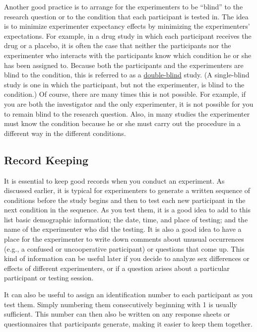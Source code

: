 \documentclass[
]{krantz}
\begin{document}
Another good practice is to arrange for the experimenters to be ``blind'' to the research question or to the condition that each participant is tested in. The idea is to minimize experimenter expectancy effects by minimizing the experimenters' expectations. For example, in a drug study in which each participant receives the drug or a placebo, it is often the case that neither the participants nor the experimenter who interacts with the participants know which condition he or she has been assigned to. Because both the participants and the experimenters are blind to the condition, this is referred to as a \hyperref[double-blind]{double-blind} study. (A single-blind study is one in which the participant, but not the experimenter, is blind to the condition.) Of course, there are many times this is not possible. For example, if you are both the investigator and the only experimenter, it is not possible for you to remain blind to the research question. Also, in many studies the experimenter must know the condition because he or she must carry out the procedure in a different way in the different conditions.

\subsection*{Record Keeping}\label{record-keeping}


It is essential to keep good records when you conduct an experiment. As discussed earlier, it is typical for experimenters to generate a written sequence of conditions before the study begins and then to test each new participant in the next condition in the sequence. As you test them, it is a good idea to add to this list basic demographic information; the date, time, and place of testing; and the name of the experimenter who did the testing. It is also a good idea to have a place for the experimenter to write down comments about unusual occurrences (e.g., a confused or uncooperative participant) or questions that come up. This kind of information can be useful later if you decide to analyze sex differences or effects of different experimenters, or if a question arises about a particular participant or testing session.

It can also be useful to assign an identification number to each participant as you test them. Simply numbering them consecutively beginning with 1 is usually sufficient. This number can then also be written on any response sheets or questionnaires that participants generate, making it easier to keep them together.
\end{document}

